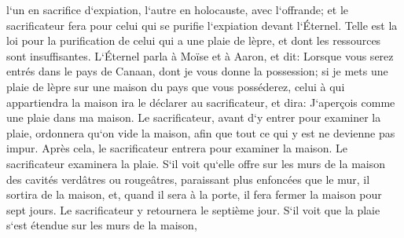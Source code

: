 \verse l`un en sacrifice d`expiation, l`autre en holocauste, avec l`offrande; et le sacrificateur fera pour celui qui se purifie l`expiation devant l`Éternel. 
\verse Telle est la loi pour la purification de celui qui a une plaie de lèpre, et dont les ressources sont insuffisantes. 
\verse L`Éternel parla à Moïse et à Aaron, et dit: 
\verse Lorsque vous serez entrés dans le pays de Canaan, dont je vous donne la possession; si je mets une plaie de lèpre sur une maison du pays que vous posséderez, 
\verse celui à qui appartiendra la maison ira le déclarer au sacrificateur, et dira: J`aperçois comme une plaie dans ma maison. 
\verse Le sacrificateur, avant d`y entrer pour examiner la plaie, ordonnera qu`on vide la maison, afin que tout ce qui y est ne devienne pas impur. Après cela, le sacrificateur entrera pour examiner la maison. 
\verse Le sacrificateur examinera la plaie. S`il voit qu`elle offre sur les murs de la maison des cavités verdâtres ou rougeâtres, paraissant plus enfoncées que le mur, 
\verse il sortira de la maison, et, quand il sera à la porte, il fera fermer la maison pour sept jours. 
\verse Le sacrificateur y retournera le septième jour. S`il voit que la plaie s`est étendue sur les murs de la maison, 

